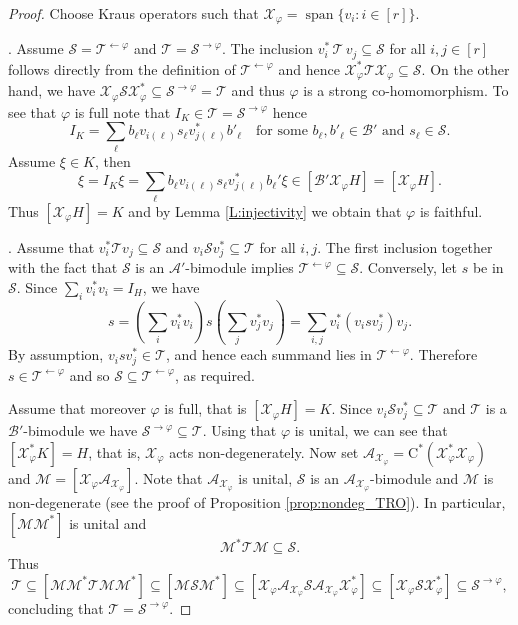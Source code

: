 \documentclass[11pt]{amsart}
\numberwithin{equation}{section}
\theoremstyle{plain}
\theoremstyle{definition}
\theoremstyle{remark}
\newcommand{\A}{{\mathcal{A}}}
\newcommand{\B}{{\mathcal{B}}}
\newcommand{\M}{{\mathcal{M}}}
\renewcommand{\S}{{\mathcal{S}}}
\newcommand{\T}{{\mathcal{T}}}
\newcommand{\X}{{\mathcal{X}}}
\newcommand\vphi{\varphi}
\newcommand{\ca}{\mathrm{C}^*}
\newcommand{\spn}{\operatorname{span}}
\begin{document}
\begin{proof}
Choose Kraus operators  such that  $\X_{\vphi} = \spn\{v_i:i\in[r]\}$.

\medskip
\noindent
[(i) $\Rightarrow$ (ii)].
Assume $\S=\T^{\leftarrow \vphi}$ and  $\T=\S^{\rightarrow \vphi}$. The inclusion $v_i^*\,\T\,v_j\subseteq \S$ for all $i,j \in [r]$ follows directly from the definition of $\T^{\leftarrow \vphi}$ and hence $ \X_{\vphi}^* \T \X_{\vphi} \subseteq \S$. On the other hand, we have $ \X_{\vphi} \S \X_{\vphi}^* \subseteq \S^{\rightarrow \vphi} =\T$ and thus $\vphi$ is a strong co-homomorphism.  To see that $\vphi$ is full note that $ I_K\in \T = \S^{\rightarrow\vphi}$ hence 
\[
I_K = \sum_{\ell} b_\ell v_{i(\ell)}s_{\ell} v_{j(\ell)}^*b'_\ell \quad \text{for some } b_\ell, b'_\ell \in \B' \text{ and } s_\ell \in \S.
\]
Assume $\xi \in K$, then 
\[
\xi=I_K \xi = \sum_{\ell} b_\ell v_{i(\ell)} s_{\ell} v_{j(\ell)}^*b_{\ell}'\xi \in [\B'\X_{\vphi} H]= [\X_{\vphi}H].
\]
Thus $[\X_{\vphi} H]= K$ and by Lemma \ref{L:injectivity} we obtain that $\vphi$ is faithful.

\medskip

\noindent
[(ii) $\Rightarrow$ (i)].
Assume that $v_i^*\T v_j\subseteq\S$ and
$v_i\S v_j^*\subseteq\T$ for all $i,j$.
The first inclusion together with the fact that $\S$ is an $\A'$-bimodule implies $\T^{\leftarrow \vphi}\subseteq\S$.
Conversely, let $s$ be in $\S$. Since $\sum_i v_i^*v_i=I_H$, we have
\[
s
=(\sum_i v_i^*v_i) s(\sum_j v_j^*v_j)
=\sum_{i,j} v_i^* (v_i s v_j^*) v_j.
\]
By assumption, $v_i s v_j^*\in\T$, and hence each summand lies in $\T^{\leftarrow \vphi}$.
Therefore $s\in\T^{\leftarrow \vphi}$ and so $\S\subseteq\T^{\leftarrow \vphi}$, as required.

Assume that moreover $ \vphi $ is full, that is $[\X_{\vphi}H]=K$. Since $v_i \S v_j^*\subseteq \T$ and $ \T$ is a $\B'$-bimodule we have $\S^{\rightarrow\vphi}\subseteq\T$.
Using that $ \vphi$ is unital, we can see that $ [\X_{\vphi}^*K]=H$, that is, $\X_{\vphi}$ acts non-degenerately. Now set $ \A_{\X_{\vphi}} =\ca(\X_{\vphi}^*\X_{\vphi})$ and $\M = [ \X_{\vphi} \A_{\X_{\vphi}}]$. Note that $\A_{\X_{\vphi}}$ is unital, $\S$ is an $\A_{\X_{\vphi}}$-bimodule and $\M$ is non-degenerate (see the proof of Proposition \ref{prop:nondeg_TRO}). In particular, $ [\M\M^*] $ is unital and
\[
\M^*\T \M \subseteq \S.
\]
Thus
\[
\T \subseteq [\M\M^* \T \M \M^*] \subseteq [\M\S\M^*] \subseteq [\X_{\vphi}\A_{\X_{\vphi}}\S \A_{\X_{\vphi}} \X_{\vphi}^*]
 \subseteq [\X_{\vphi}\S \X_{\vphi}^*] \subseteq\S^{\rightarrow\vphi},
\]
concluding that $ \T = \S^{\rightarrow\vphi}$.


\end{proof}
\end{document}
